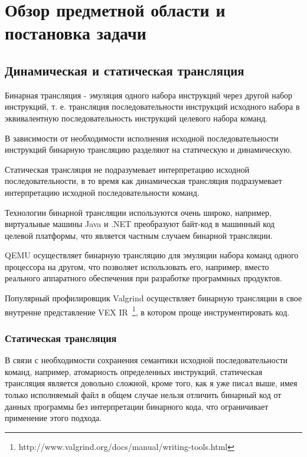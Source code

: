 \chapter{Обзор предметной области и постановка задачи}

\section{Динамическая и статическая трансляция}

\begin{Def}\label{binary_translation}
Бинарная трансляция - эмуляция одного набора инструкций через другой набор инструкций, т. е. трансляция последовательности инструкций исходного набора в эквивалентную последовательность инструкций целевого набора команд.
\end{Def}

В зависимости от необходимости исполнения исходной последовательности инструкций бинарную трансляцию разделяют на статическую и динамическую.

Статическая трансляция не подразумевает интерпретацию исходной последовательности, в то время как динамическая трансляция подразумевает интерпретацию исходной последовательности команд.

Технологии бинарной трансляции используются очень широко, например, виртуальные машины Java и .NET преобразуют байт-код в машинный код целевой платформы, что является частным случаем бинарной трансляции.

QEMU осуществляет бинарную трансляцию для эмуляции набора команд одного процессора на другом, что позволяет использовать его, например, вместо реального аппаратного обеспечения при разработке программных продуктов.

Популярный профилировщик Valgrind осуществляет бинарную трансляции в свое внутренне представление VEX IR~\footnote{http://www.valgrind.org/docs/manual/writing-tools.html}, в котором проще инструментировать код.

\subsection{Статическая трансляция}

В связи с необходимости сохранения семантики исходной последовательности команд, например, атомарность определенных инструкций, статическая трансляция является довольно сложной, кроме того, как я уже писал выше, имея только исполняемый файл в общем случае нельзя отличить бинарный код от данных программы без интерпретации бинарного кода, что ограничивает применение этого подхода.

